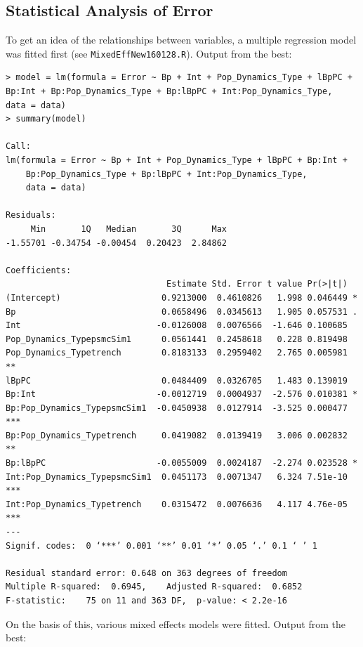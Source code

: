 \documentclass[11pt,a4paper]{article}
\begin{document}
\subsection{Statistical Analysis of Error}
To get an idea of the relationships between variables, a multiple regression model was fitted first (see \verb|MixedEffNew160128.R|). Output from the best:
\begin{lstlisting}
> model = lm(formula = Error ~ Bp + Int + Pop_Dynamics_Type + lBpPC + Bp:Int + Bp:Pop_Dynamics_Type + Bp:lBpPC + Int:Pop_Dynamics_Type,  data = data)
> summary(model)

Call:
lm(formula = Error ~ Bp + Int + Pop_Dynamics_Type + lBpPC + Bp:Int + 
    Bp:Pop_Dynamics_Type + Bp:lBpPC + Int:Pop_Dynamics_Type, 
    data = data)

Residuals:
     Min       1Q   Median       3Q      Max 
-1.55701 -0.34754 -0.00454  0.20423  2.84862 

Coefficients:
                                Estimate Std. Error t value Pr(>|t|)    
(Intercept)                    0.9213000  0.4610826   1.998 0.046449 *  
Bp                             0.0658496  0.0345613   1.905 0.057531 .  
Int                           -0.0126008  0.0076566  -1.646 0.100685    
Pop_Dynamics_TypepsmcSim1      0.0561441  0.2458618   0.228 0.819498    
Pop_Dynamics_Typetrench        0.8183133  0.2959402   2.765 0.005981 ** 
lBpPC                          0.0484409  0.0326705   1.483 0.139019    
Bp:Int                        -0.0012719  0.0004937  -2.576 0.010381 *  
Bp:Pop_Dynamics_TypepsmcSim1  -0.0450938  0.0127914  -3.525 0.000477 ***
Bp:Pop_Dynamics_Typetrench     0.0419082  0.0139419   3.006 0.002832 ** 
Bp:lBpPC                      -0.0055009  0.0024187  -2.274 0.023528 *  
Int:Pop_Dynamics_TypepsmcSim1  0.0451173  0.0071347   6.324 7.51e-10 ***
Int:Pop_Dynamics_Typetrench    0.0315472  0.0076636   4.117 4.76e-05 ***
---
Signif. codes:  0 ‘***’ 0.001 ‘**’ 0.01 ‘*’ 0.05 ‘.’ 0.1 ‘ ’ 1

Residual standard error: 0.648 on 363 degrees of freedom
Multiple R-squared:  0.6945,	Adjusted R-squared:  0.6852 
F-statistic:    75 on 11 and 363 DF,  p-value: < 2.2e-16
\end{lstlisting}
On the basis of this, various mixed effects models were fitted. Output from the best:
\end{document}

